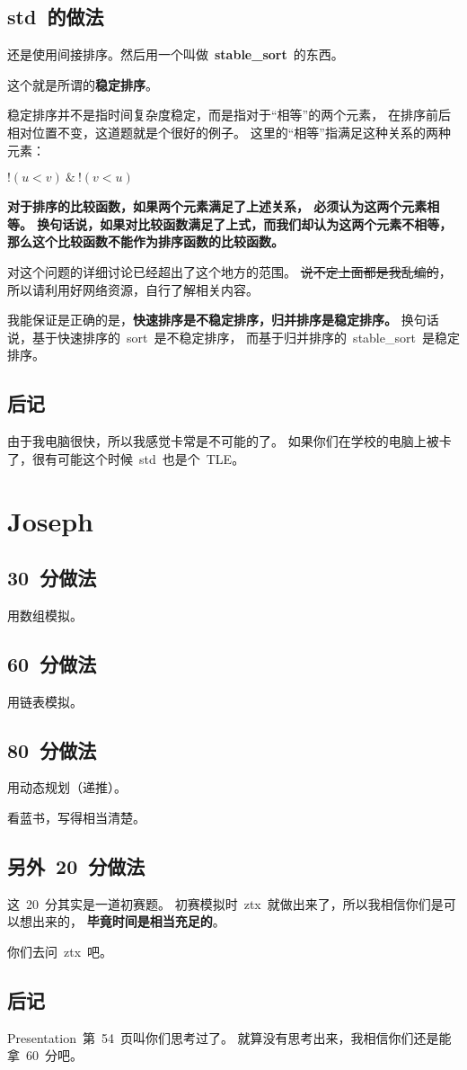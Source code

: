 \documentclass[12pt, hyperref, UTF8]{article}
\begin{document}
	\subsection{std~的做法}
	还是使用间接排序。然后用一个叫做~\textbf{stable\_sort}~的东西。
	
	\bigskip
	这个就是所谓的\textbf{稳定排序}。
	
	稳定排序并不是指时间复杂度稳定，而是指对于“相等”的两个元素，
	在排序前后相对位置不变，这道题就是个很好的例子。
	这里的“相等”指满足这种关系的两种元素：
	\begin{center}
		$!(u < v) ~\&~ !(v < u)$
	\end{center}
	
	\textbf{对于排序的比较函数，如果两个元素满足了上述关系，
	必须认为这两个元素相等。
	换句话说，如果对比较函数满足了上式，而我们却认为这两个元素不相等，
	那么这个比较函数不能作为排序函数的比较函数。}

	对这个问题的详细讨论已经超出了这个地方的范围。
	\sout{说不定上面都是我乱编的}，
	所以请利用好网络资源，自行了解相关内容。

	\bigskip
	我能保证是正确的是，\textbf{快速排序是不稳定排序，归并排序是稳定排序。}
	换句话说，基于快速排序的~sort~是不稳定排序，
	而基于归并排序的~stable\_sort~是稳定排序。

	\subsection{后记}
	由于我电脑很快，所以我感觉卡常是不可能的了。
	如果你们在学校的电脑上被卡了，很有可能这个时候~std~也是个~TLE。

	\section{Joseph}

	\subsection{30~分做法}
	用数组模拟。

	\subsection{60~分做法}
	用链表模拟。

	\subsection{80~分做法}
	用动态规划（递推）。
	
	看蓝书，写得相当清楚。

	\subsection{另外~20~分做法}
	这~20~分其实是一道初赛题。
	初赛模拟时~ztx~就做出来了，所以我相信你们是可以想出来的，
	\textbf{毕竟时间是相当充足的}。

	你们去问~ztx~吧。

	\subsection{后记}
	Presentation~第~54~页叫你们思考过了。
	就算没有思考出来，我相信你们还是能拿~60~分吧。
\end{document}
